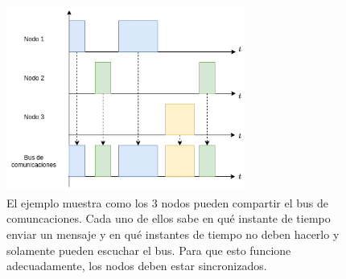 \begin{figure}[H]
    \centering
    \includegraphics[width=0.7\textwidth]{img/TDMA_esquema.png}
    \caption{El ejemplo muestra como los 3 nodos pueden compartir el bus de comuncaciones. Cada uno de ellos sabe en qué instante de tiempo enviar un mensaje y en qué instantes de tiempo no deben hacerlo y solamente pueden escuchar el bus. Para que esto funcione adecuadamente, los nodos deben estar sincronizados.}
    \label{fig:TDMA_esquema}
\end{figure}







